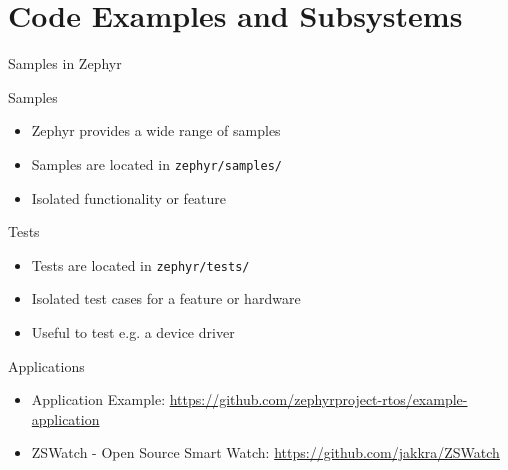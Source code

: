 \documentclass[10pt, aspectratio=169]{beamer}
\begin{document}
\section{Code Examples and Subsystems}
\begin{frame}[fragile]{Samples in Zephyr}

  \begin{block}{Samples}
    \begin{itemize}
      \item Zephyr provides a wide range of samples
      \item Samples are located in \texttt{zephyr/samples/}
      \item Isolated functionality or feature
    \end{itemize}
  \end{block}
  \begin{block}{Tests}
    \begin{itemize}
      \item Tests are located in \texttt{zephyr/tests/}
      \item Isolated test cases for a feature or hardware
      \item Useful to test e.g. a device driver
    \end{itemize}
  \end{block}
  \begin{block}{Applications}
    \begin{itemize}
      \item Application Example: {\scriptsize \url{https://github.com/zephyrproject-rtos/example-application}}
      \item ZSWatch - Open Source Smart Watch: {\scriptsize \url{https://github.com/jakkra/ZSWatch}}
    \end{itemize}
  \end{block}
\end{frame}
\end{document}
